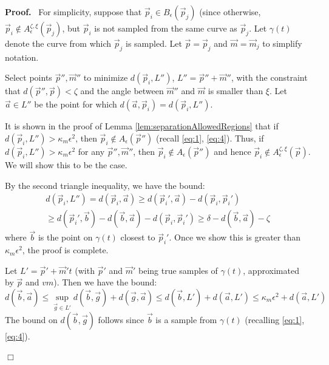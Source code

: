 \documentclass{article}
\newcommand{\nin}{\not\in}
\newenvironment{proof}{
  \noindent\textbf{Proof.}\ }{\hspace*{\fill}
  \begin{math}\Box\end{math}\medskip}
\numberwithin{cntr}{section}
\numberwithin{equation}{section}
\newcommand{\vp}[0]{{\vec{p}}}
\newcommand{\vm}[0]{{\vec{m}}}
\newcommand{\va}[0]{{\vec{a}}}
\newcommand{\vb}[0]{{\vec{b}}}
\newcommand{\vg}[0]{{\vec{g}}}
\newcommand{\ball}[2]{ { B_{#1}(#2) } }
\newcommand{\allowed}[2]{ { A_{#1}(#2) } }
\newcommand{\curvemax}{{\kappa_{m}}}
\newcommand{\curvesep}{{\delta}}
\newcommand{\pointNoise}{{\zeta}}
\newcommand{\tanNoise}{{\xi}}
\newcommand{\nallowed}[2]{ { A^{\pointNoise, \tanNoise}_{#1}(#2) } }
\begin{document}
\begin{proof}
  For simplicity, suppose that $\vp_{i} \in \ball{\epsilon}{\vp_{j}}$ (since otherwise, $\vp_{i} \nin \nallowed{\epsilon}{\vp_{j}}$, but $\vp_{i}$ is not sampled from the same curve as $\vp_{j}$. Let $\gamma(t)$ denote the curve from which $\vp_{j}$ is sampled. Let $\vp = \vp_{j}$ and $\vm = \vm_{j}$ to simplify notation.

  Select points $\vp'', \vm''$ to minimize $d(\vp_{i},L'')$, $L''=\vp''+\vm''$, with the constraint that $d(\vp'',\vp) < \pointNoise$ and the angle between $\vm''$ and $\vm$ is smaller than $\tanNoise$. Let $\va \in L''$ be the point for which $d(\va,\vp_{i}) = d(\vp_{i},L'')$.

  It is shown in the proof of Lemma \ref{lem:separationAllowedRegions} that if $d(\vp_{i}, L'') > \curvemax \epsilon^{2}$, then $\vp_{i} \nin \allowed{\epsilon}{\vp''}$ (recall \eqref{eq:1}, \eqref{eq:4}). Thus, if $d(\vp_{i},L'') > \curvemax \epsilon^{2}$ for any $\vp'', \vm''$, then $\vp_{i} \nin \allowed{\epsilon}{\vp''}$ and hence $\vp_{i} \nin \nallowed{\epsilon}{\vp}$. We will show this to be the case.


  By the second triangle inequality, we have the bound:
  \begin{multline}
    \label{eq:7}
    d(\vp_{i},L'') = d(\vp_{i},\va) \geq d(\vp_{i}',\va) - d(\vp_{i}, \vp_{i}')\\
    \geq d(\vp_{i}', \vb) - d(\vb,\va) - d(\vp_{i}, \vp_{i}')
    \geq \curvesep - d(\vb,\va) - \pointNoise
  \end{multline}
  where $\vb$ is the point on $\gamma(t)$ closest to $\vp_{i}'$. Once we show this is greater than $\curvemax \epsilon^{2}$, the proof is complete.

Let $L'=\vp' + \vm' t$ (with $\vp'$ and $\vm'$ being true samples of $\gamma(t)$, approximated by $\vp$ and $vm$). Then we have the bound:
  \begin{equation}
    \label{eq:6}
    d(\vb,\va) \leq \sup_{\vg \in L'} d(\vb,\vg) + d(\vg, \va) \leq d(\vb,L') + d(\va,L') \leq \curvemax \epsilon^{2} + d(\va,L')
  \end{equation}
  The bound on $d(\vb, \vg)$ follows since $\vb$ is a sample from $\gamma(t)$ (recalling \eqref{eq:1}, \eqref{eq:4}).


\end{proof}
\end{document}
